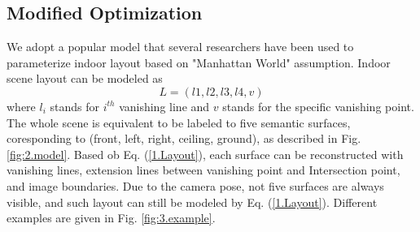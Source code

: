 \subsection{Modified Optimization}
\label{subsection:optimization}
We adopt a popular model that several researchers\cite{hedau2009recovering}\cite{dasgupta2016delay}\cite{ren2016coarse} have been used to parameterize indoor layout based on "Manhattan World" assumption. Indoor scene layout can be modeled as 
\begin{equation}
	\label{1.Layout}
	L = (l1, l2, l3, l4, v)
\end{equation}
where $l_{i}$ stands for $i^{th}$ vanishing line and $v$ stands for the specific vanishing point. The whole scene is equivalent to be labeled to five semantic surfaces, coresponding to (front, left, right, ceiling, ground), as described in Fig. \ref{fig:2.model}. Based ob Eq. (\ref{1.Layout}), each surface can be reconstructed with vanishing lines, extension lines between vanishing point and Intersection point, and image boundaries. Due to the camera pose, not five surfaces are always visible, and such layout can still be modeled by Eq. (\ref{1.Layout}). Different examples are given in Fig. \ref{fig:3.example}.